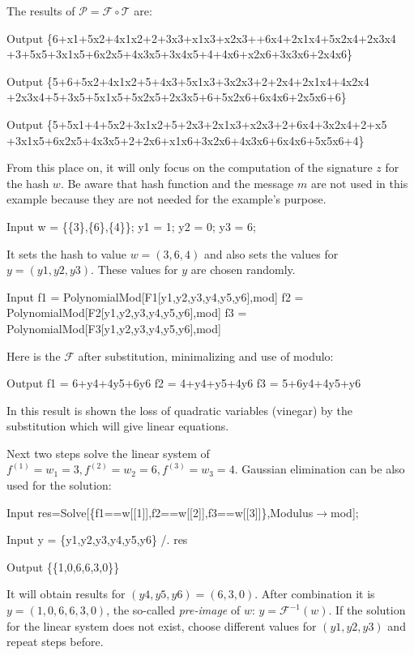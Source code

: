 \documentclass[thesis=M,english]{FITthesis}[2019/12/23]
\begin{document}
\noindent
The results of $\mathcal{P} = \mathcal{F} \circ \mathcal{T}$ are:
\begin{mmaCell}[addtoindex=3,leftmargin=1em]{Output}
\{6+x1+5x2+4x1x2+2+3x3+x1x3+x2x3++6x4+2x1x4+5x2x4+2x3x4
+3+5x5+3x1x5+6x2x5+4x3x5+3x4x5+4+4x6+x2x6+3x3x6+2x4x6\}
\end{mmaCell}
\begin{mmaCell}[leftmargin=1em]{Output}
\{5+6+5x2+4x1x2+5+4x3+5x1x3+3x2x3+2+2x4+2x1x4+4x2x4
+2x3x4+5+3x5+5x1x5+5x2x5+2x3x5+6+5x2x6+6x4x6+2x5x6+6\}
\end{mmaCell}
\begin{mmaCell}[leftmargin=1em]{Output}
\{5+5x1+4+5x2+3x1x2+5+2x3+2x1x3+x2x3+2+6x4+3x2x4+2+x5
+3x1x5+6x2x5+4x3x5+2+2x6+x1x6+3x2x6+4x3x6+6x4x6+5x5x6+4\}
\end{mmaCell}
From this place on, it will only focus on the computation of the signature $z$ for the hash $w$. Be aware that hash function and the message $m$ are not used in this example because they are not needed for the example's purpose.
\begin{mmaCell}[moredefined={w, y1, y2, y3}]{Input}
w = \{\{3\},\{6\},\{4\}\};
y1 = 1;
y2 = 0;
y3 = 6;
\end{mmaCell}
It sets the hash to value $w = (3,6,4)$ and also sets the values for $y = (y1,y2,y3)$. These values for $y$ are chosen randomly.
\begin{mmaCell}[addtoindex=3,moredefined={f1, F1, y1, y2, y3, mod, f2, F2, f3, F3}]{Input}
f1 = PolynomialMod[F1[y1,y2,y3,y4,y5,y6],mod]
f2 = PolynomialMod[F2[y1,y2,y3,y4,y5,y6],mod]
f3 = PolynomialMod[F3[y1,y2,y3,y4,y5,y6],mod]
\end{mmaCell}
Here is the $\mathcal{F}$ after substitution, minimalizing and use of modulo:
\begin{mmaCell}{Output}
f1 = 6+y4+4y5+6y6
f2 = 4+y4+y5+4y6
f3 = 5+6y4+4y5+y6
\end{mmaCell}
In this result is shown the loss of quadratic variables (vinegar) by the substitution which will give linear equations.

\bigskip
\noindent
Next two steps solve the linear system of $f^{(1)} = w_1 = 3, f^{(2)} = w_2 = 6, f^{(3)} = w_3 = 4$. Gaussian elimination can be also used for the solution:
\begin{mmaCell}[moredefined={res, f1, w, f2, f3, mod}]{Input}
res=Solve[\{f1==w[[1]],f2==w[[2]],f3==w[[3]]\},Modulus\(\pmb{\to}\)mod];
\end{mmaCell}
\begin{mmaCell}[moredefined={y, y1, y2, y3, res}]{Input}
y = \{y1,y2,y3,y4,y5,y6\} /. res
\end{mmaCell}
\begin{mmaCell}{Output}
\{\{1,0,6,6,3,0\}\}
\end{mmaCell}
It will obtain results for $(y4,y5,y6) = (6,3,0)$. After combination it is $y = (1,0,6,6,3,0)$, the so-called \textit{pre-image} of $w$: $y = \mathcal{F}^{-1}(w)$. If the solution for the linear system does not exist, choose different values for $(y1,y2,y3)$ and repeat steps before.
\end{document}
